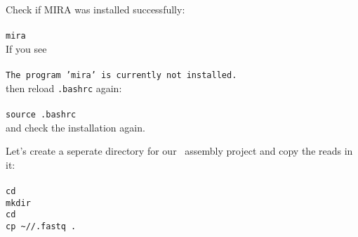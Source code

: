 Check if MIRA was installed successfully:\\~\\
\texttt{mira}\\

If you see\\~\\
\texttt{The program 'mira' is currently not installed.}\\

then reload \texttt{.bashrc} again:\\~\\
\texttt{source .bashrc}\\

and check the installation again.

Let's create a seperate directory for our \denovo~assembly project 
and copy the reads in it:\\~\\
\texttt{cd \workDir}\\
\texttt{mkdir \denovoDir}\\
\texttt{cd \denovoDir}\\
\texttt{cp \textasciitilde/\dataDir/\denovoReads.fastq~.}\\

